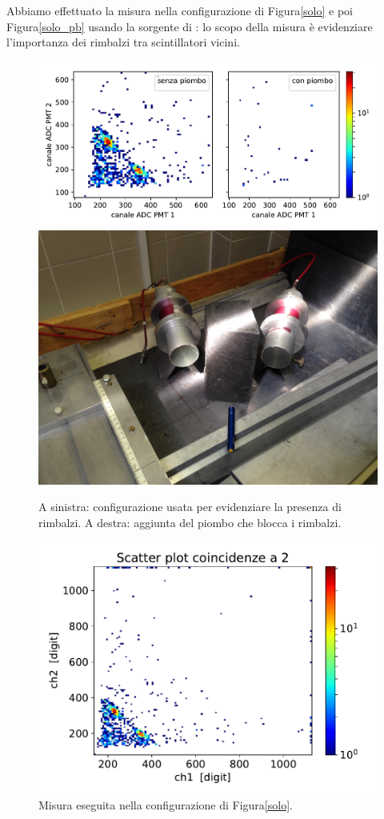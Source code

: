 Abbiamo effettuato la misura nella configurazione di Figura\autoref{solo} e poi Figura\autoref{solo_pb} usando la sorgente di \cs{}: lo scopo della misura è evidenziare l'importanza dei rimbalzi tra scintillatori vicini.

\begin{figure}[h]
\centering
\subfloat
{\includegraphics[width=17 em]{immagini/rimb} \label{solo} }
\subfloat
{\includegraphics[width=17 em]{immagini/norimb} \label{solo_pb}}
\caption{A sinistra: configurazione usata per evidenziare la presenza di rimbalzi. A destra: aggiunta del piombo che blocca i rimbalzi.}
\end{figure}

\begin{figure}[h]
\centering
\includegraphics[width=\textwidth]{immagini/ce_ri}
\caption{Misura eseguita nella configurazione di Figura\autoref{solo}.}
\label{ce}
\end{figure}

